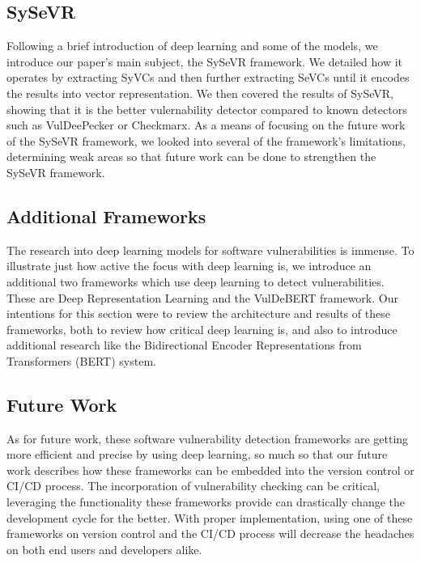 \documentclass[12pt,twocolumn,letterpaper]{article}
\begin{document}
\subsection{SySeVR}
Following a brief introduction of deep learning and some of the models, we introduce our paper's main subject, the SySeVR framework.
We detailed how it operates by extracting SyVCs and then further extracting SeVCs until it encodes the results into vector representation. We then covered the
results of SySeVR, showing that it is the better vulernability detector compared to known detectors such as VulDeePecker or Checkmarx. As a means of focusing on the future work of the
SySeVR framework, we looked into several of the framework's limitations, determining weak areas so that future work can be done to strengthen the SySeVR framework.
\subsection{Additional Frameworks}
The research into deep learning models for software vulnerabilities is immense. To illustrate just how active the focus with deep learning is, we
introduce an additional two frameworks which use deep learning to detect vulnerabilities. These are Deep Representation Learning and the VulDeBERT framework. Our intentions for this section
were to review the architecture and results of these frameworks, both to review how critical deep learning is, and also to introduce additional research like the Bidirectional Encoder Representations from Transformers (BERT) system.
\subsection{Future Work}
As for future work, these software vulnerability detection frameworks are getting more efficient and precise by using deep learning, so much so
that our future work describes how these frameworks can be embedded into the version control or CI/CD process. The incorporation of vulnerability checking can be critical, leveraging the functionality
these frameworks provide can drastically change the development cycle for the better. With proper implementation, using one of these frameworks on version control and the CI/CD process will decrease
the headaches on both end users and developers alike.

{\small


}
\end{document}
